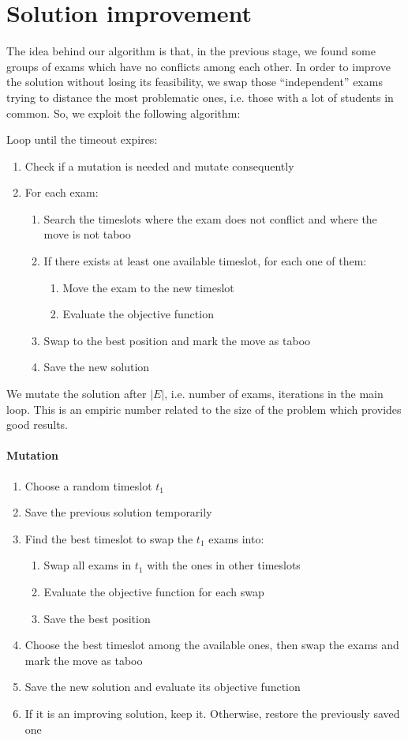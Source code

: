 \section*{Solution improvement}
The idea behind our algorithm is that, in the previous stage, we found some groups of exams which have no conflicts among each other. In order to improve the solution without losing its feasibility, we swap those ``independent'' exams trying to distance the most problematic ones, i.e. those with a lot of students in common.
So, we exploit the following algorithm:

Loop until the timeout expires:
\begin{enumerate}
\item Check if a mutation is needed and mutate consequently
\item For each exam:
\begin{enumerate}
\item Search the timeslots where the exam does not conflict and where the move is not taboo
\item If there exists at least one available timeslot, for each one of them:
\begin{enumerate}
\item Move the exam to the new timeslot
\item Evaluate the objective function
\end{enumerate}
\item Swap to the best position and mark the move as taboo
\item Save the new solution
\end{enumerate}
\end{enumerate}
We mutate the solution after $|E|$, i.e. number of exams, iterations in the main loop. This is an empiric number related to the size of the problem which provides good results.
\paragraph*{Mutation}
\begin{enumerate}
\item Choose a random timeslot $t_1$
\item Save the previous solution temporarily
\item Find the best timeslot to swap the $t_1$ exams into:
\begin{enumerate}
\item Swap all exams in $t_1$ with the ones in other timeslots
\item Evaluate the objective function for each swap
\item Save the best position
\end{enumerate}
\item Choose the best timeslot among the available ones, then swap the exams and mark the move as taboo
\item Save the new solution and evaluate its objective function
\item If it is an improving solution, keep it. Otherwise, restore the previously saved one
\end{enumerate}